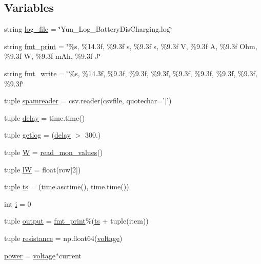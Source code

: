 \subsection*{Variables}
\begin{DoxyCompactItemize}
\item 
string \hyperlink{namespaceYun__Log__BatteryDisCharging_ae9fb446099ac1137500398f8012e4c78}{log\-\_\-file} = \char`\"{}Yun\-\_\-\-Log\-\_\-\-Battery\-Dis\-Charging.\-log\char`\"{}
\item 
string \hyperlink{namespaceYun__Log__BatteryDisCharging_a9494efc17bebd5108d694922d40b4a31}{fmt\-\_\-print} = \char`\"{}\%s, \%14.\-3f, \%9.\-3f s, \%9.\-3f s, \%9.\-3f V, \%9.\-3f A, \%9.\-3f Ohm, \%9.\-3f W, \%9.\-3f m\-Ah, \%9.\-3f J\char`\"{}
\item 
string \hyperlink{namespaceYun__Log__BatteryDisCharging_a19bfe285d1481a648dd2a31df1ab7db6}{fmt\-\_\-write} = \char`\"{}\%s, \%14.\-3f, \%9.\-3f, \%9.\-3f, \%9.\-3f, \%9.\-3f, \%9.\-3f, \%9.\-3f, \%9.\-3f, \%9.\-3f\char`\"{}
\item 
tuple \hyperlink{namespaceYun__Log__BatteryDisCharging_a1fc7e423503335a66f4fd41bbde26dad}{spamreader} = csv.\-reader(csvfile, quotechar='$\vert$')
\item 
tuple \hyperlink{namespaceYun__Log__BatteryDisCharging_a93560f3e3069eb2b837c46f1472b67d2}{delay} = time.\-time()
\item 
tuple \hyperlink{namespaceYun__Log__BatteryDisCharging_a1c9d6cfdb58049e1f92a6211fbbdee35}{getlog} = (\hyperlink{namespaceYun__Log__BatteryDisCharging_a93560f3e3069eb2b837c46f1472b67d2}{delay} $>$ 300.)
\item 
tuple \hyperlink{namespaceYun__Log__BatteryDisCharging_af49a254e15f4c7271a3b0e9fc5abb852}{W} = \hyperlink{namespaceYun__Log__BatteryDisCharging_a3a6547d581b469aa63fade6254839685}{read\-\_\-mon\-\_\-values}()
\item 
tuple \hyperlink{namespaceYun__Log__BatteryDisCharging_afe66ed561e996e3621e1c0bccd34db56}{l\-W} = float(row\mbox{[}2\mbox{]})
\item 
tuple \hyperlink{namespaceYun__Log__BatteryDisCharging_a7b85c87d0afd81ec33b920d0365b20a0}{ts} = (time.\-asctime(), time.\-time())
\item 
int \hyperlink{namespaceYun__Log__BatteryDisCharging_a654150a60ddad75d24477880074dc41b}{i} = 0
\item 
tuple \hyperlink{namespaceYun__Log__BatteryDisCharging_a8b945e1cfc118372730aa3ab025d90c5}{output} = \hyperlink{namespaceYun__Log__BatteryDisCharging_a9494efc17bebd5108d694922d40b4a31}{fmt\-\_\-print}\%(\hyperlink{namespaceYun__Log__BatteryDisCharging_a7b85c87d0afd81ec33b920d0365b20a0}{ts} + tuple(item))
\item 
tuple \hyperlink{namespaceYun__Log__BatteryDisCharging_a19af7a3497f83959d28f31bb4432606b}{resistance} = np.\-float64(\hyperlink{Uno__Read__HumidityCapacitor__KFS140-D_8ino_a003bbb537dac1547ff44bac4bf180a73}{voltage})
\item 
\hyperlink{namespaceYun__Log__BatteryDisCharging_a7c9819144fe5b77a4121c5c2b6b72db9}{power} = \hyperlink{Uno__Read__HumidityCapacitor__KFS140-D_8ino_a003bbb537dac1547ff44bac4bf180a73}{voltage}$\ast$current
\end{DoxyCompactItemize}


